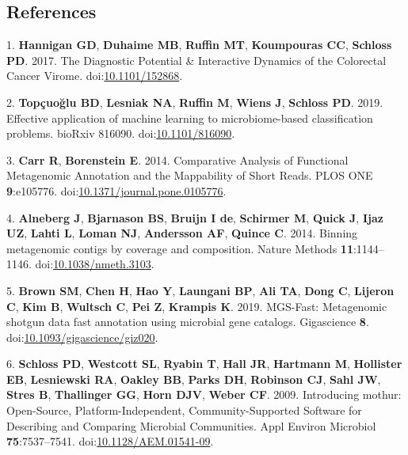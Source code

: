 \documentclass[11pt,]{article}
\begin{document}
\hypertarget{references}{%
\subsection*{References}\label{references}}

\hypertarget{refs}{}
\leavevmode\hypertarget{ref-hannigan_diagnostic_2017}{}%
1. \textbf{Hannigan GD}, \textbf{Duhaime MB}, \textbf{Ruffin MT},
\textbf{Koumpouras CC}, \textbf{Schloss PD}. 2017. The Diagnostic
Potential \& Interactive Dynamics of the Colorectal Cancer Virome.
doi:\href{https://doi.org/10.1101/152868}{10.1101/152868}.

\leavevmode\hypertarget{ref-topcuoglu_effective_2019}{}%
2. \textbf{Topçuoğlu BD}, \textbf{Lesniak NA}, \textbf{Ruffin M},
\textbf{Wiens J}, \textbf{Schloss PD}. 2019. Effective application of
machine learning to microbiome-based classification problems. bioRxiv
816090. doi:\href{https://doi.org/10.1101/816090}{10.1101/816090}.

\leavevmode\hypertarget{ref-carr_comparative_2014}{}%
3. \textbf{Carr R}, \textbf{Borenstein E}. 2014. Comparative Analysis of
Functional Metagenomic Annotation and the Mappability of Short Reads.
PLOS ONE \textbf{9}:e105776.
doi:\href{https://doi.org/10.1371/journal.pone.0105776}{10.1371/journal.pone.0105776}.

\leavevmode\hypertarget{ref-alneberg_binning_2014}{}%
4. \textbf{Alneberg J}, \textbf{Bjarnason BS}, \textbf{Bruijn I de},
\textbf{Schirmer M}, \textbf{Quick J}, \textbf{Ijaz UZ}, \textbf{Lahti
L}, \textbf{Loman NJ}, \textbf{Andersson AF}, \textbf{Quince C}. 2014.
Binning metagenomic contigs by coverage and composition. Nature Methods
\textbf{11}:1144--1146.
doi:\href{https://doi.org/10.1038/nmeth.3103}{10.1038/nmeth.3103}.

\leavevmode\hypertarget{ref-brown_mgs-fast_2019}{}%
5. \textbf{Brown SM}, \textbf{Chen H}, \textbf{Hao Y}, \textbf{Laungani
BP}, \textbf{Ali TA}, \textbf{Dong C}, \textbf{Lijeron C}, \textbf{Kim
B}, \textbf{Wultsch C}, \textbf{Pei Z}, \textbf{Krampis K}. 2019.
MGS-Fast: Metagenomic shotgun data fast annotation using microbial gene
catalogs. Gigascience \textbf{8}.
doi:\href{https://doi.org/10.1093/gigascience/giz020}{10.1093/gigascience/giz020}.

\leavevmode\hypertarget{ref-schloss_introducing_2009}{}%
6. \textbf{Schloss PD}, \textbf{Westcott SL}, \textbf{Ryabin T},
\textbf{Hall JR}, \textbf{Hartmann M}, \textbf{Hollister EB},
\textbf{Lesniewski RA}, \textbf{Oakley BB}, \textbf{Parks DH},
\textbf{Robinson CJ}, \textbf{Sahl JW}, \textbf{Stres B},
\textbf{Thallinger GG}, \textbf{Horn DJV}, \textbf{Weber CF}. 2009.
Introducing mothur: Open-Source, Platform-Independent,
Community-Supported Software for Describing and Comparing Microbial
Communities. Appl Environ Microbiol \textbf{75}:7537--7541.
doi:\href{https://doi.org/10.1128/AEM.01541-09}{10.1128/AEM.01541-09}.
\end{document}
